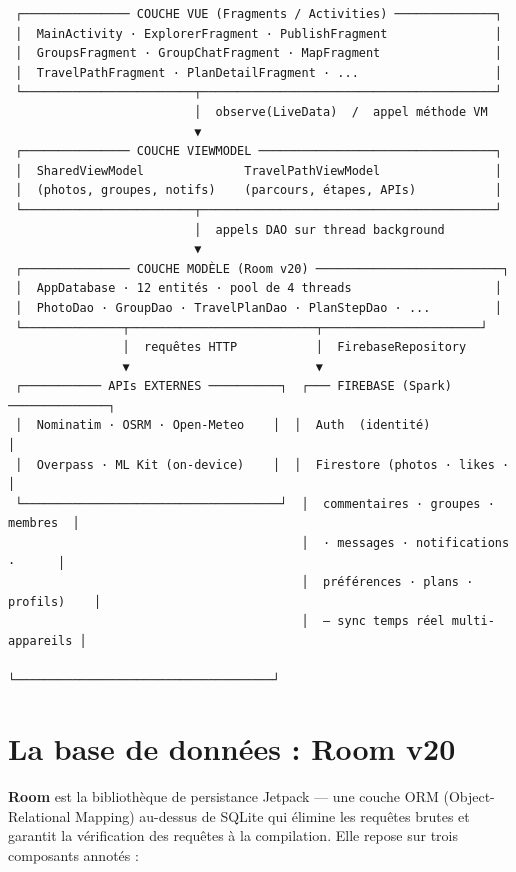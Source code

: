 \documentclass[a4paper,12pt,openany]{report}
\begin{document}
\begin{tcolorbox}[mybox,colback=codebg,colframe=bord,
  left=10pt,right=10pt,top=8pt,bottom=8pt]
{\ttfamily\footnotesize\color{navy!80}
\begin{verbatim}
 ┌─────────────── COUCHE VUE (Fragments / Activities) ──────────────┐
 │  MainActivity · ExplorerFragment · PublishFragment               │
 │  GroupsFragment · GroupChatFragment · MapFragment                │
 │  TravelPathFragment · PlanDetailFragment · ...                   │
 └────────────────────────┬─────────────────────────────────────────┘
                          │  observe(LiveData)  /  appel méthode VM
                          ▼
 ┌─────────────── COUCHE VIEWMODEL ─────────────────────────────────┐
 │  SharedViewModel              TravelPathViewModel                │
 │  (photos, groupes, notifs)    (parcours, étapes, APIs)           │
 └────────────────────────┬─────────────────────────────────────────┘
                          │  appels DAO sur thread background
                          ▼
 ┌─────────────── COUCHE MODÈLE (Room v20) ──────────────────────────┐
 │  AppDatabase · 12 entités · pool de 4 threads                    │
 │  PhotoDao · GroupDao · TravelPlanDao · PlanStepDao · ...         │
 └──────────────┬──────────────────────────┬──────────────────────┘
                │  requêtes HTTP           │  FirebaseRepository
                ▼                          ▼
 ┌─────────── APIs EXTERNES ──────────┐  ┌─── FIREBASE (Spark) ──────────────┐
 │  Nominatim · OSRM · Open-Meteo    │  │  Auth  (identité)                 │
 │  Overpass · ML Kit (on-device)    │  │  Firestore (photos · likes ·       │
 └────────────────────────────────────┘  │  commentaires · groupes · membres  │
                                         │  · messages · notifications ·      │
                                         │  préférences · plans · profils)    │
                                         │  — sync temps réel multi-appareils │
                                         └────────────────────────────────────┘
\end{verbatim}}
\end{tcolorbox}


\section{La base de données : Room v20}

\textbf{Room} est la bibliothèque de persistance Jetpack — une couche ORM
(Object-Relational Mapping) au-dessus de SQLite qui élimine les requêtes brutes
et garantit la vérification des requêtes à la compilation. Elle repose sur
trois composants annotés :
\end{document}
